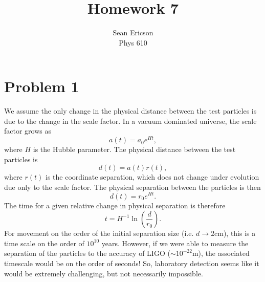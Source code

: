 \documentclass[12pt]{article}
\begin{document}
\title{Homework 7}
\author{Sean Ericson \\ Phys 610}
\maketitle

\section*{Problem 1}
We assume the only change in the physical distance between the test particles is due to the change in the scale factor. In a vacuum dominated universe, the scale factor grows as
\[ a(t) = a_0 e^{Ht},  \]
where $H$ is the Hubble parameter. The physical distance between the test particles is 
\[ d(t) = a(t)r(t), \]
where $r(t)$ is the coordinate separation, which does not change under evolution due only to the scale factor. The physical separation between the particles is then 
\[ d(t) = r_0e^{Ht}. \]
The time for a given relative change in physical separation is therefore
\[ t = H^{-1}\ln(\frac{d}{r_0}). \]
For movement on the order of the initial separation size (i.e. $d \to 2$cm), this is a time scale on the order of $10^{10}$ years. However, if we were able to measure the separation of the particles to the accuracy of LIGO ($\sim 10^{-22}$m), the associated timescale would be on the order of seconds! So, laboratory detection seems like it would be extremely challenging, but not necessarily impossible. 
\end{document}
